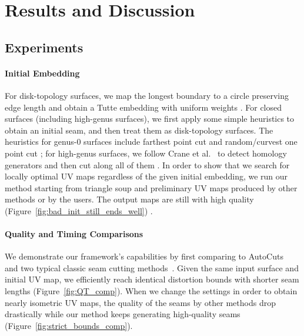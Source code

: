 
\section{Results and Discussion}
\label{sec:results}

\subsection{Experiments}
\label{sec:results_exp}

\paragraph{Initial Embedding} For disk-topology surfaces, we map the longest boundary to a circle preserving edge length and obtain a Tutte embedding with uniform weights . For closed surfaces (including high-genus surfaces), we first apply some simple heuristics to obtain an initial seam, and then treat them as disk-topology surfaces. 
The heuristics for genus-0 surfaces include farthest point cut and random/curvest one point cut ; for high-genus surfaces, we follow Crane et al.~ to detect homology generators and then cut along all of them \minchen{[TODO]}.
In order to show that we search for locally optimal UV maps regardless of the given initial embedding, we run our method starting from triangle soup and preliminary UV maps produced by other methods or by the users. The output maps are still with high quality (Figure~\ref{fig:bad_init_still_ends_well}) \minchen{[TODO]}.

\paragraph{Quality and Timing Comparisons}  We demonstrate our framework's capabilities by first comparing to AutoCuts~\cite{Poranne2017Autocuts} and two typical classic seam cutting methods~\cite{Gu2002Geometry,Sheffer2002Seamster}. Given the same input surface and initial UV map, we efficiently reach identical distortion bounds with shorter seam lengths (Figure~\ref{fig:QT_comp}). 
When we change the settings in order to obtain nearly isometric UV maps, the quality of the seams by other methods drop drastically while our method keeps generating high-quality seams (Figure~\ref{fig:strict_bounds_comp}).

